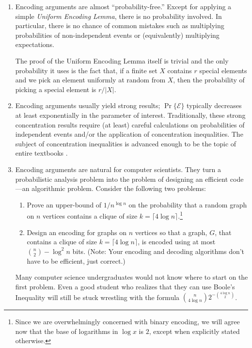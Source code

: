 \documentclass{patmorin}
\begin{document}
\begin{enumerate}
\item Encoding arguments are almost ``probability-free.''  Except for
  applying a simple \emph{Uniform Encoding Lemma}, there is no
  probability involved.  In particular, there is no chance of
  common mistakes such as multiplying probabilities of non-independent
  events or (equivalently) multiplying expectations.

  The proof of the Uniform Encoding Lemma itself is trivial and the
  only probability it uses is the fact that, if a finite set $X$
  contains $r$ special elements and we pick an element uniformly at
  random from $X$, then the probability of picking a special element
  is $r/|X|$.

\item Encoding arguments usually yield strong results;
  $\Pr\{\mathcal{E}\}$ typically decreases at least exponentially in
  the parameter of interest. Traditionally, these strong concentration
  results require (at least) careful calculations on probabilities of
  independent events and/or the application of concentration
  inequalities.  The subject of concentration inequalities is advanced
  enough to be the topic of entire textbooks
  \cite{boucheron.lugosi.ea:concentration,dubhashi.panconesi:concentration}.
  
\item Encoding arguments are natural for computer scientists. They
  turn a probabilistic analysis problem into the problem of designing
  an efficient code---an algorithmic problem. Consider the following
  two problems:
  \begin{enumerate}

  \item Prove an upper-bound of $1/n^{\log n}$ on the probability that
    a random graph on $n$ vertices contains a clique of size $k=\lceil
    4\log n\rceil$.\footnote{Since we are overwhelmingly concerned with
    binary encoding, we will
    agree now that the base of logarithms in $\log x$ is $2$, except when
    explicitly stated otherwise.}

  \item Design an encoding for graphs on $n$ vertices so that a graph,
    $G$, that contains a clique of size $k=\lceil 4\log n\rceil$, is
    encoded using at most $\binom{n}{2}-\log^2 n$ bits. (Note: Your
    encoding and decoding algorithms don't have to be efficient, just
    correct.)
  \end{enumerate}
  Many computer science undergraduates would not know where to start
  on the first problem.  Even a good student who realizes that they
  can use Boole's Inequality will still be stuck wrestling with the
  formula $\binom{n}{4\log n}2^{-\binom{4\log n}{2}}$.
\end{enumerate}
\end{document}
